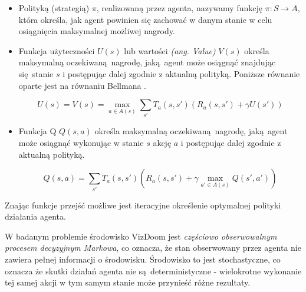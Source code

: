 \begin{itemize}
\item Polityką (strategią) $\pi$, realizowaną przez agenta, nazywamy funkcję $ \pi: S \rightarrow A$, która określa, jak agent powinien się zachować w danym stanie w celu osiągnięcia maksymalnej możliwej nagrody.
\item Funkcja użyteczności $U(s)$ lub wartości \textit{(ang. Value)} $V(s)$ określa maksymalną oczekiwaną nagrodę, jaką agent może osiągnąć znajdując się stanie $s$ i postępując dalej zgodnie z aktualną polityką. Poniższe równanie oparte jest na równaniu Bellmana \cite{bellman1954}.

$$U(s) = V(s) = \max_{a \in A(s)} \sum_{s'} T_a(s,s')(R_a(s,s') + \gamma U(s'))$$
\item Funkcja Q $Q(s,a)$ określa maksymalną oczekiwaną nagrodę, jaką agent może osiągnąć wykonując w stanie $s$ akcję $a$ i postępując dalej zgodnie z aktualną polityką.

$$Q(s,a) = \sum_{s'} T_a(s,s')(R_a(s,s') + \gamma \max_{a' \in A(s)}Q(s',a'))$$

\end{itemize}

\vspace{5mm}

Znając funkcje przejść możliwe jest iteracyjne określenie optymalnej polityki działania agenta. 

W badanym problemie środowisko VizDoom jest \textit{częściowo obserwowalnym procesem decyzyjnym Markowa}, co oznacza, że stan obserwowany przez agenta nie zawiera pełnej informacji o środowisku. Środowisko to jest stochastyczne, co oznacza że skutki działań agenta nie są deterministyczne - wielokrotne wykonanie tej samej akcji w tym samym stanie może przynieść różne rezultaty.
